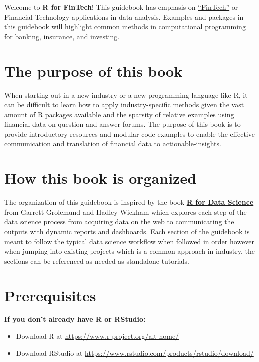 \documentclass[]{book}
\providecommand{\tightlist}{%
  \setlength{\itemsep}{0pt}\setlength{\parskip}{0pt}}
\begin{document}
Welcome to \textbf{R for FinTech}! This guidebook has emphasis on
\href{https://en.wikipedia.org/wiki/Financial_technology}{``FinTech''}
or Financial Technology applications in data analysis. Examples and
packages in this guidebook will highlight common methods in
computational programming for banking, insurance, and investing.

\section{\texorpdfstring{\textbf{The purpose of this
book}}{The purpose of this book}}\label{the-purpose-of-this-book}

When starting out in a new industry or a new programming language like
R, it can be difficult to learn how to apply industry-specific methods
given the vast amount of R packages available and the sparsity of
relative examples using financial data on question and answer forums.
The purpose of this book is to provide introductory resources and
modular code examples to enable the effective communication and
translation of financial data to actionable-insights.

\section{\texorpdfstring{\textbf{How this book is
organized}}{How this book is organized}}\label{how-this-book-is-organized}

The organization of this guidebook is inspired by the book
\href{http://r4ds.had.co.nz/}{\textbf{R for Data Science}} from Garrett
Grolemund and Hadley Wickham which explores each step of the data
science process from acquiring data on the web to communicating the
outputs with dynamic reports and dashboards. Each section of the
guidebook is meant to follow the typical data science workflow when
followed in order however when jumping into existing projects which is a
common approach in industry, the sections can be referenced as needed as
standalone tutorials.

\section{\texorpdfstring{\textbf{Prerequisites}}{Prerequisites}}\label{prerequisites}

\textbf{If you don't already have R or RStudio:}

\begin{itemize}
\tightlist
\item
  Download R at \url{https://www.r-project.org/alt-home/}
\item
  Download RStudio at
  \url{https://www.rstudio.com/products/rstudio/download/}
\end{itemize}
\end{document}
